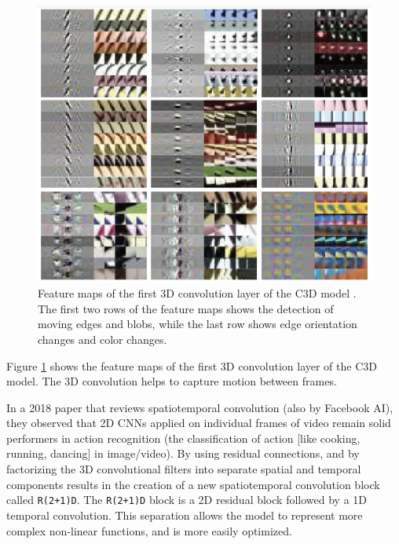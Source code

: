 \begin{figure}
    \centering
    \includegraphics[width=1\textwidth]{images/video_synthesis/c3d_feature_maps.png}
    \caption{Feature maps of the first 3D convolution layer of the C3D model \cite{tran2015learning}. The first two rows of the feature maps shows the detection of moving edges and blobs, while the last row shows edge orientation changes and color changes.}
    \label{fig:c3d_feature_maps}
\end{figure}

Figure \ref{fig:c3d_feature_maps} shows the feature maps of the first 3D convolution layer of the C3D model. The 3D convolution helps to capture motion between frames.

In a 2018 paper \cite{tran2018closer} that reviews spatiotemporal convolution (also by Facebook AI), they observed that 2D CNNs applied on individual frames of video remain solid performers in action recognition (the classification of action [like cooking, running, dancing] in image/video). By using residual connections, and by factorizing the 3D convolutional filters into separate spatial and temporal components results in the creation of a new spatiotemporal convolution block called \texttt{R(2+1)D}. The \texttt{R(2+1)D} block is a 2D residual block followed by a 1D temporal convolution. This separation allows the model to represent more complex non-linear functions, and is more easily optimized.







